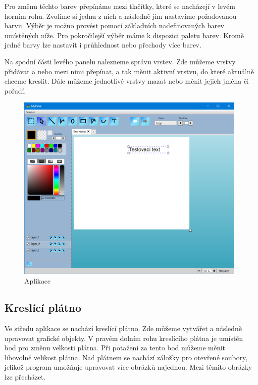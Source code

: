 \documentclass[
  field=inf,
  biblatex,
  glossaries,
  index
]{kidiplom}
\begin{document}
Pro změnu těchto barev přepínáme mezi tlačítky, které se nacházejí v  levém horním rohu. Zvolíme si jednu z nich a následně jim nastavíme požadovanou barvu. Výběr je možno provést pomocí základních nadefinovaných barev umístěných níže. Pro pokročilejší výběr máme k dispozici paletu barev. Kromě jedné barvy lze nastavit i průhlednost nebo přechody více barev.

Na spodní části levého panelu nalezneme správu vrstev. Zde můžeme vrstvy přidávat a nebo mezi nimi přepínat, a tak měnit aktivní vrstvu, do které aktuálně chceme kreslit. Dále můžeme jednotlivé vrstvy mazat nebo měnit jejich jména či pořadí.

\begin{figure}
\includegraphics[width=15cm]{img/program}
\caption{Aplikace}
\end{figure}  

\subsection{Kreslící plátno}

Ve středu aplikace se nachází kreslící plátno. Zde můžeme vytvářet a následně upravovat grafické objekty. V pravém dolním rohu kreslícího plátna je umístěn bod pro změnu velkosti plátna. Při potažení za tento bod můžeme měnit libovolně velikost plátna. Nad plátnem se nachází záložky pro otevřené soubory, jelikož program umožňuje upravovat více obrázků najednou. Mezi těmito obrázky lze přecházet.
\end{document}
